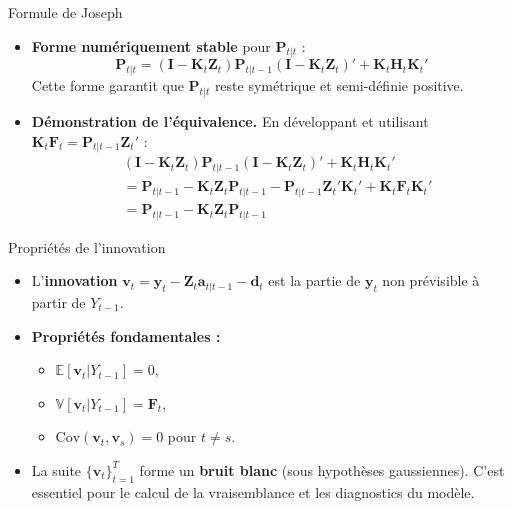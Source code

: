 \documentclass[11pt,aspectratio=169]{beamer}
\newcommand{\E}{\mathbb{E}}
\newcommand{\Var}{\mathbb{V}}
\newcommand{\Cov}{\mathrm{Cov}}
\begin{document}
\begin{frame}{Formule de Joseph}

\begin{itemize}

\item \textbf{Forme numériquement stable} pour $\bm{P}_{t|t}$ :
  \[
  \bm{P}_{t|t} = (\bm{I} - \bm{K}_t \bm{Z}_t) \bm{P}_{t|t-1} (\bm{I} - \bm{K}_t \bm{Z}_t)' + \bm{K}_t \bm{H}_t \bm{K}_t'
  \]
  Cette forme garantit que $\bm{P}_{t|t}$ reste symétrique et semi-définie positive.\newline

\item \textbf{Démonstration de l'équivalence.} En développant et utilisant $\bm{K}_t \bm{F}_t = \bm{P}_{t|t-1} \bm{Z}_t'$ :
  \begin{align*}
  &(\bm{I} - \bm{K}_t \bm{Z}_t) \bm{P}_{t|t-1} (\bm{I} - \bm{K}_t \bm{Z}_t)' + \bm{K}_t \bm{H}_t \bm{K}_t' \\
  &= \bm{P}_{t|t-1} - \bm{K}_t \bm{Z}_t \bm{P}_{t|t-1} - \bm{P}_{t|t-1} \bm{Z}_t' \bm{K}_t' + \bm{K}_t \bm{F}_t \bm{K}_t' \\
  &= \bm{P}_{t|t-1} - \bm{K}_t \bm{Z}_t \bm{P}_{t|t-1}
  \end{align*}

\end{itemize}

\end{frame}

\begin{frame}{Propriétés de l'innovation}

\begin{itemize}

\item L'\textbf{innovation} $\bm{v}_t = \bm{y}_t - \bm{Z}_t \bm{a}_{t|t-1} - \bm{d}_t$ est la partie de $\bm{y}_t$ non prévisible à partir de $Y_{t-1}$.\newline

\item \textbf{Propriétés fondamentales :}
  \begin{itemize}
  \item $\E[\bm{v}_t | Y_{t-1}] = 0$,
  \item $\Var[\bm{v}_t | Y_{t-1}] = \bm{F}_t$,
  \item $\Cov(\bm{v}_t, \bm{v}_s) = 0$ pour $t \neq s$.
  \end{itemize}

\item La suite $\{\bm{v}_t\}_{t=1}^T$ forme un \textbf{bruit blanc} (sous hypothèses gaussiennes). C'est essentiel pour le calcul de la vraisemblance et les diagnostics du modèle.

\end{itemize}

\end{frame}
\end{document}
